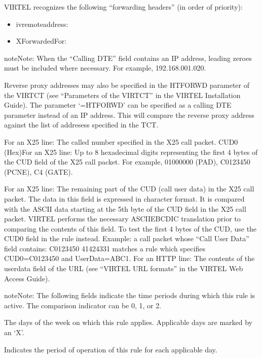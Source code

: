 \documentclass[letterpaper,10pt,english]{sphinxmanual}
\begin{document}
\begin{description}
\sphinxAtStartPar
VIRTEL recognizes the following “forwarding headers” (in order of priority):
\begin{itemize}
\item {} 
\sphinxAtStartPar
iv\sphinxhyphen{}remote\sphinxhyphen{}address:

\item {} 
\sphinxAtStartPar
X\sphinxhyphen{}Forwarded\sphinxhyphen{}For:

\end{itemize}

\begin{sphinxadmonition}{note}{Note:}
\sphinxAtStartPar
When the “Calling DTE” field contains an IP address, leading zeroes must be included where necessary. For example, 192.168.001.020.
\end{sphinxadmonition}

\sphinxAtStartPar
Reverse proxy addresses may also be specified in the HTFORWD parameter of the VIRTCT (see “Parameters of the VIRTCT” in the VIRTEL Installation Guide). The parameter ‘=HTFORWD’ can be specified as a calling DTE parameter instead of an IP address. This will compare the reverse proxy address against the list of addresess specified in the TCT.

\sphinxAtStartPar
For an X25 line: The called number specified in the X25 call packet. CUD0 (Hex)For an X25 line: Up to 8 hexadecimal digits representing the first 4 bytes of the CUD field of the X25 call packet. For example, 01000000 (PAD), C0123450 (PCNE), C4 (GATE).

\sphinxAtStartPar
For an X25 line: The remaining part of the CUD (call user data) in the X25 call packet. The data in this field is expressed in character format. It is compared with the ASCII data starting at the 5th byte of the CUD field in the X25 call packet. VIRTEL performs the necessary ASCII\sphinxhyphen{}EBCDIC translation prior to comparing the contents of this field. To test the first 4 bytes of the CUD, use the CUD0 field in the rule instead. Example: a call packet whose “Call User Data” field contains: C0123450 41424331 matches a rule which specifies CUD0=C0123450 and UserData=ABC1. For an HTTP line: The contents of the userdata field of the URL (see “VIRTEL URL formats” in the VIRTEL Web Access Guide).

\end{description}

\begin{sphinxadmonition}{note}{Note:}
\sphinxAtStartPar
The following fields indicate the time periods during which this rule is active. The comparison indicator can be 0, 1, or 2.
\end{sphinxadmonition}
\begin{description}
\sphinxAtStartPar
The days of the week on which this rule applies. Applicable days are marked by an ‘X’.

\sphinxAtStartPar
Indicates the period of operation of this rule for each applicable day.

\end{description}
\end{document}
